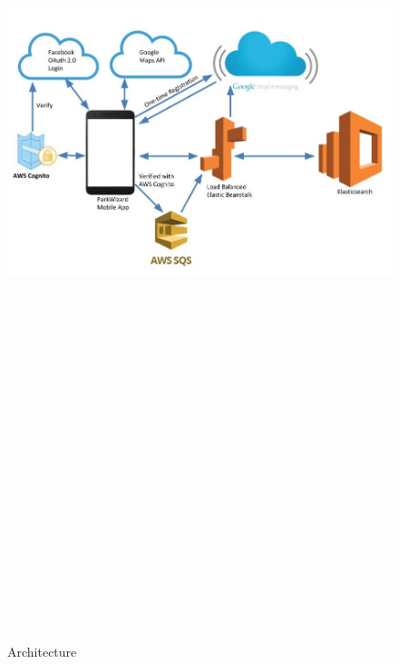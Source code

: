 \documentclass[final]{beamer}
\newlength{\twocolwid}
\begin{document}
\begin{frame}[t]
\begin{columns}[t]
\begin{column}{\twocolwid}
\vspace{1ex}

\begin{figure}
\includegraphics[width=47cm,height=29cm]{architecture.jpg}
\caption{Architecture}
\end{figure}


\end{column}
\end{columns}
\end{frame}
\end{document}

